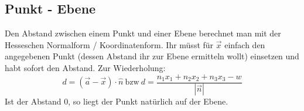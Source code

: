 \subsection{Punkt - Ebene}
	Den Abstand zwischen einem Punkt und einer Ebene berechnet man mit der
	Hesseschen Normalform / Koordinatenform. Ihr müsst für \(\vec{x}\) einfach den
	angegebenen Punkt (dessen Abstand ihr zur Ebene ermitteln wollt) einsetzen und
	habt sofort den Abstand. Zur Wiederholung:
	\[d=(\vec{a}-\vec{x})\cdot \hat{n} \mathrm{\ bzw\ }
	d=\frac{n_1x_1+n_2x_2+n_3x_3-w}{|\vec{n}|}\]
	Ist der Abstand 0, so liegt der Punkt natürlich auf der Ebene.
